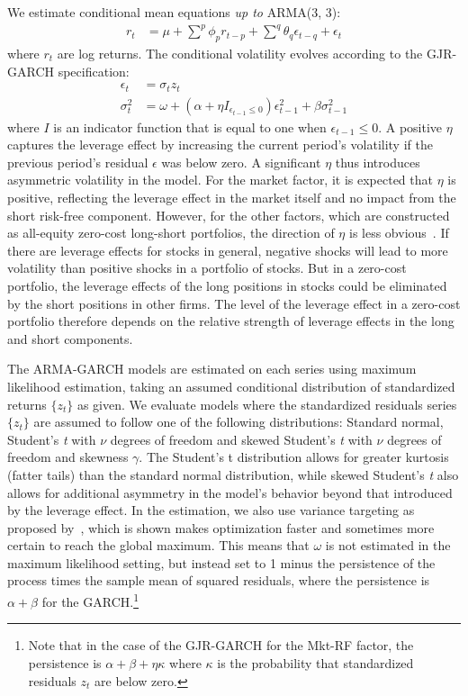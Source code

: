 We estimate conditional mean equations \emph{up to} ARMA(3, 3):
\begin{align}
  r_t &=
    \mu +
    \sum^p \phi_p r_{t - p} +
    \sum^q \theta_q \epsilon_{t - q} + 
    \epsilon_t
\end{align}
where $r_t$ are log returns. The conditional volatility evolves according to the GJR-GARCH specification:
\begin{align}
  \epsilon_t &= \sigma_t z_t \\
  \sigma_t^2 &=
    \omega +
    (\alpha + \eta I_{\epsilon_{t-1} \leq 0}) \epsilon_{t - 1}^2 +
    \beta \sigma^2_{t - 1}
\end{align}
where $I$ is an indicator function that is equal to one when $\epsilon_{t-1} \leq 0$. A positive $\eta$ captures the leverage effect by increasing the current period's volatility if the previous period's residual $\epsilon$ was below zero. A significant $\eta$ thus introduces asymmetric volatility in the model. For the market factor, it is expected that $\eta$ is positive, reflecting the leverage effect in the market itself and no impact from the short risk-free component. However, for the other factors, which are constructed as all-equity zero-cost long-short portfolios, the direction of $\eta$ is less obvious~\autocite{ChristoffersenLanglois2013}. If there are leverage effects for stocks in general, negative shocks will lead to more volatility than positive shocks in a portfolio of stocks. But in a zero-cost portfolio, the leverage effects of the long positions in stocks could be eliminated by the short positions in other firms. The level of the leverage effect in a zero-cost portfolio therefore depends on the relative strength of leverage effects in the long and short components.

The ARMA-GARCH models are estimated on each series using maximum likelihood estimation, taking an assumed conditional distribution of standardized returns $\{z_t\}$ as given. We evaluate models where the standardized residuals series $\{z_t\}$ are assumed to follow one of the following distributions: Standard normal, Student's \textit{t} with $\nu$ degrees of freedom and skewed Student's \textit{t} with $\nu$ degrees of freedom and skewness $\gamma$. The Student's t distribution allows for greater kurtosis (fatter tails) than the standard normal distribution, while skewed Student's \textit{t} also allows for additional asymmetry in the model's behavior beyond that introduced by the leverage effect. In the estimation, we also use variance targeting as proposed by~\textcite{EngleMezrich1995}, which is shown makes optimization faster and sometimes more certain to reach the global maximum. This means that $\omega$ is not estimated in the maximum likelihood setting, but instead set to 1 minus the persistence of the process times the sample mean of squared residuals, where the persistence is $\alpha + \beta$ for the GARCH.\footnote{Note that in the case of the GJR-GARCH for the Mkt-RF factor, the persistence is $\alpha + \beta + \eta \kappa$ where $\kappa$ is the probability that standardized residuals $z_t$ are below zero.}

